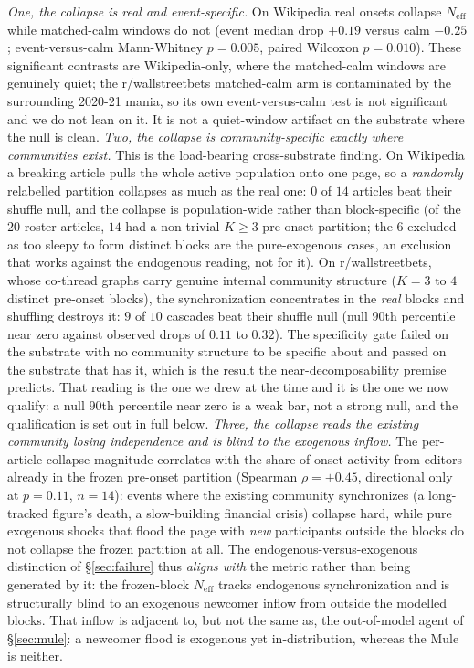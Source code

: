 \documentclass[11pt]{article}
\begin{document}
\emph{One, the collapse is real and event-specific.} On Wikipedia real onsets collapse $N_{\mathrm{eff}}$ while matched-calm windows do not (event median drop $+0.19$ versus calm $-0.25$; event-versus-calm Mann-Whitney $p=0.005$, paired Wilcoxon $p=0.010$). These significant contrasts are Wikipedia-only, where the matched-calm windows are genuinely quiet; the r/wallstreetbets matched-calm arm is contaminated by the surrounding 2020-21 mania, so its own event-versus-calm test is not significant and we do not lean on it. It is not a quiet-window artifact on the substrate where the null is clean. \emph{Two, the collapse is community-specific exactly where communities exist.} This is the load-bearing cross-substrate finding. On Wikipedia a breaking article pulls the whole active population onto one page, so a \emph{randomly} relabelled partition collapses as much as the real one: $0$ of $14$ articles beat their shuffle null, and the collapse is population-wide rather than block-specific (of the $20$ roster articles, $14$ had a non-trivial $K\ge3$ pre-onset partition; the $6$ excluded as too sleepy to form distinct blocks are the pure-exogenous cases, an exclusion that works against the endogenous reading, not for it). On r/wallstreetbets, whose co-thread graphs carry genuine internal community structure ($K=3$ to $4$ distinct pre-onset blocks), the synchronization concentrates in the \emph{real} blocks and shuffling destroys it: $9$ of $10$ cascades beat their shuffle null (null $90$th percentile near zero against observed drops of $0.11$ to $0.32$). The specificity gate failed on the substrate with no community structure to be specific about and passed on the substrate that has it, which is the result the near-decomposability premise predicts. That reading is the one we drew at the time and it is the one we now qualify: a null $90$th percentile near zero is a weak bar, not a strong null, and the qualification is set out in full below. \emph{Three, the collapse reads the \emph{existing} community losing independence and is blind to the exogenous inflow.} The per-article collapse magnitude correlates with the share of onset activity from editors already in the frozen pre-onset partition (Spearman $\rho=+0.45$, directional only at $p=0.11$, $n=14$): events where the existing community synchronizes (a long-tracked figure's death, a slow-building financial crisis) collapse hard, while pure exogenous shocks that flood the page with \emph{new} participants outside the blocks do not collapse the frozen partition at all. The endogenous-versus-exogenous distinction of \S\ref{sec:failure} thus \emph{aligns with} the metric rather than being generated by it: the frozen-block $N_{\mathrm{eff}}$ tracks endogenous synchronization and is structurally blind to an exogenous newcomer inflow from outside the modelled blocks. That inflow is adjacent to, but not the same as, the out-of-model agent of \S\ref{sec:mule}: a newcomer flood is exogenous yet in-distribution, whereas the Mule is neither.
\end{document}
